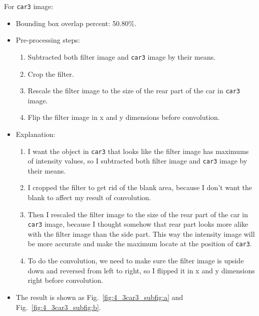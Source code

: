 \documentclass{assignment}
\begin{document}
\begin{problemlist}
For \texttt{car3} image:
\begin{itemize}
    \item Bounding box overlap percent: 50.80\%.
    \item Pre-processing steps: 
    \begin{enumerate}[label={\alph*)}]
        \item Subtracted both filter image and \texttt{car3} image by their means.
        \item Crop the filter.
        \item Rescale the filter image to the size of the rear part of the car in \texttt{car3} image.
        \item Flip the filter image in x and y dimensions before convolution.
    \end{enumerate}
    \item Explanation: 
    \begin{enumerate}[label={\alph*)}]
        \item I want the object in \texttt{car3} that looks like the filter image has maximums of intensity values, so I subtracted both filter image and \texttt{car3} image by their means.
        \item I cropped the filter to get rid of the blank area, because I don't want the blank to affect my result of convolution.
        \item Then I rescaled the filter image to the size of the rear part of the car in \texttt{car3} image, because I thought somehow that rear part looks more alike with the filter image than the side part. This way the intensity image will be more accurate and make the maximum locate at the position of \texttt{car3}.
        \item To do the convolution, we need to make sure the filter image is upside down and reversed from left to right, so I flipped it in x and y dimensions right before convolution.
    \end{enumerate}
    \item The result is shown as Fig.~\ref{fig:4_3car3_subfig:a} and Fig.~\ref{fig:4_3car3_subfig:b}.
\end{itemize}


\end{problemlist}
\end{document}
